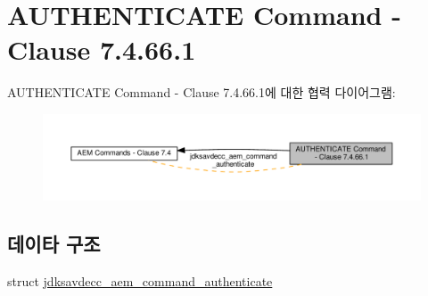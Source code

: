\hypertarget{group__command__authenticate}{}\section{A\+U\+T\+H\+E\+N\+T\+I\+C\+A\+TE Command -\/ Clause 7.4.66.1}
\label{group__command__authenticate}
A\+U\+T\+H\+E\+N\+T\+I\+C\+A\+TE Command -\/ Clause 7.4.66.1에 대한 협력 다이어그램\+:
\nopagebreak
\begin{figure}[H]
\begin{center}
\leavevmode
\includegraphics[width=350pt]{group__command__authenticate}
\end{center}
\end{figure}
\subsection*{데이타 구조}
\begin{DoxyCompactItemize}
\item 
struct \hyperlink{structjdksavdecc__aem__command__authenticate}{jdksavdecc\+\_\+aem\+\_\+command\+\_\+authenticate}
\end{DoxyCompactItemize}
